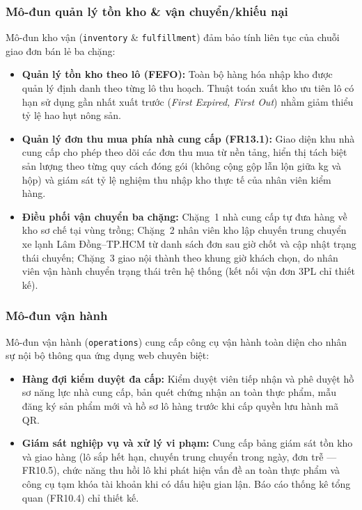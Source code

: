 \subsubsection*{Mô-đun quản lý tồn kho \& vận chuyển/khiếu nại}
Mô-đun kho vận (\texttt{inventory} \& \texttt{fulfillment}) đảm bảo tính liên tục của chuỗi giao đơn bán lẻ ba chặng:
\begin{itemize}
    \item \textbf{Quản lý tồn kho theo lô (FEFO):} Toàn bộ hàng hóa nhập kho được quản lý định danh theo từng lô thu hoạch. Thuật toán xuất kho ưu tiên lô có hạn sử dụng gần nhất xuất trước (\emph{First Expired, First Out}) nhằm giảm thiểu tỷ lệ hao hụt nông sản.
    \item \textbf{Quản lý đơn thu mua phía nhà cung cấp (FR13.1):} Giao diện khu nhà cung cấp cho phép theo dõi các đơn thu mua từ nền tảng, hiển thị tách biệt sản lượng theo từng quy cách đóng gói (không cộng gộp lẫn lộn giữa kg và hộp) và giám sát tỷ lệ nghiệm thu nhập kho thực tế của nhân viên kiểm hàng.
    \item \textbf{Điều phối vận chuyển ba chặng:} Chặng~1 nhà cung cấp tự đưa hàng về kho sơ chế tại vùng trồng; Chặng~2 nhân viên kho lập chuyến trung chuyển xe lạnh Lâm Đồng--TP.HCM từ danh sách đơn sau giờ chốt và cập nhật trạng thái chuyến; Chặng~3 giao nội thành theo khung giờ khách chọn, do nhân viên vận hành chuyển trạng thái trên hệ thống (kết nối vận đơn 3PL chỉ thiết kế).
\end{itemize}

\subsubsection*{Mô-đun vận hành}
Mô-đun vận hành (\texttt{operations}) cung cấp công cụ vận hành toàn diện cho nhân sự nội bộ thông qua ứng dụng web chuyên biệt:
\begin{itemize}
    \item \textbf{Hàng đợi kiểm duyệt đa cấp:} Kiểm duyệt viên tiếp nhận và phê duyệt hồ sơ năng lực nhà cung cấp, bản quét chứng nhận an toàn thực phẩm, mẫu đăng ký sản phẩm mới và hồ sơ lô hàng trước khi cấp quyền lưu hành mã QR.
    \item \textbf{Giám sát nghiệp vụ và xử lý vi phạm:} Cung cấp bảng giám sát tồn kho và giao hàng (lô sắp hết hạn, chuyến trung chuyển trong ngày, đơn trễ --- FR10.5), chức năng thu hồi lô khi phát hiện vấn đề an toàn thực phẩm và công cụ tạm khóa tài khoản khi có dấu hiệu gian lận. Báo cáo thống kê tổng quan (FR10.4) chỉ thiết kế.
\end{itemize}

